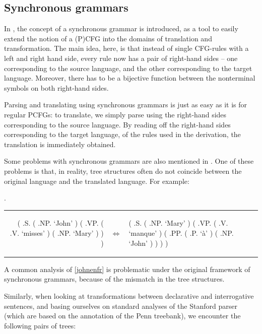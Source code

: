 \documentclass[a4paper]{article}
\theoremstyle{definition}
\begin{document}
\subsection{Synchronous grammars}
\label{subsec:synch}

In \cite{Ch}, the concept of a synchronous grammar is introduced, as a tool to
easily extend the notion of a (P)CFG into the domains of translation and
transformation. The main idea, here, is that instead of single CFG-rules with a
left and right hand side, every rule now has a pair of right-hand sides -- one
corresponding to the source language, and the other corresponding to the target
language. Moreover, there has to be a bijective function between the
nonterminal symbols on both right-hand sides.

Parsing and translating using synchronous grammars is just as easy as it is for
regular PCFGs: to translate, we simply parse using the right-hand sides
corresponding to the source language. By reading off the right-hand sides
corresponding to the target language, of the rules used in the derivation, the
translation is immediately obtained.

Some problems with synchronous grammars are also mentioned in \cite{Ch}. One of
these problems is that, in reality, tree structures often do not coincide
between the original language and the translated language. For example:

\ex.
\label{johnenfr}

\begin{tabular}{ r m{3em} l }
\begin{parsetree}
( .S.
	( .NP. `John' )
	( .VP.
		( .V. `misses' )
		( .NP. `Mary' )
	)
)
\end{parsetree}
& $\iff$ &
\begin{parsetree}
( .S.
	( .NP. `Mary' )
	( .VP.
		( .V. `manque' )
		( .PP.
			( .P. `à' )
			( .NP. `John' )
		)
	)
)
\end{parsetree}
\end{tabular}
\vspace{1em}

A common analysis of \ref{johnenfr} is problematic under the original
framework of synchronous grammars, because of the mismatch in the tree
structures.

Similarly, when looking at transformations between declarative and
interrogative sentences, and basing ourselves on standard analyses of the
Stanford parser (which are based on the annotation of the Penn
treebank), we encounter the following pairs of trees:
\end{document}
